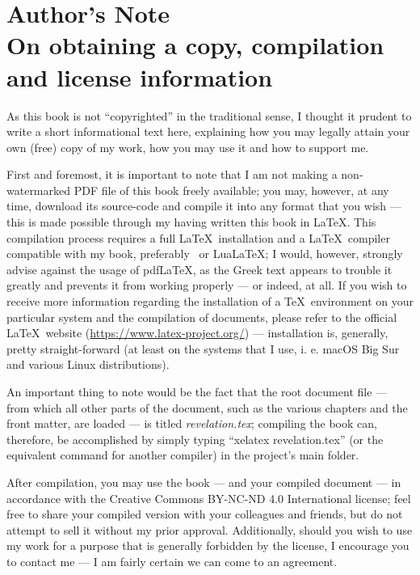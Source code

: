 \chapter*{Author's Note  \\ \large On obtaining a copy, compilation and license information}

As this book is not “copyrighted” in the traditional sense, I thought it prudent to write a short informational text here, explaining how you may legally attain your own (free) copy of my work, how you may use it and how to support me. 

First and foremost, it is important to note that I am not making a non-watermarked PDF file of this book freely available; you may, however, at any time, download its source-code and compile it into any format that you wish — this is made possible through my having written this book in \LaTeX. This compilation process requires a full \LaTeX\ installation and a \LaTeX\ compiler compatible with my book, preferably \XeLaTeX\ or Lua\LaTeX; I would, however, strongly advise against the usage of pdf\LaTeX, as the Greek text appears to trouble it greatly and prevents it from working properly — or indeed, at all. If you wish to receive more information regarding the installation of a \TeX\ environment on your particular system and the compilation of documents, please refer to the official \LaTeX\ website (\url{https://www.latex-project.org/}) — installation is, generally, pretty straight-forward (at least on the systems that I use, i. e. macOS Big Sur and various Linux distributions). 

An important thing to note would be the fact that the root document file — from which all other parts of the document, such as the various chapters and the front matter, are loaded — is titled \textit{revelation.tex}; compiling the book can, therefore, be accomplished by simply typing “xelatex revelation.tex” (or the equivalent command for another compiler) in the project's main folder. 

After compilation, you may use the book — and your compiled document — in accordance with the Creative Commons BY-NC-ND 4.0 International license; feel free to share your compiled version with your colleagues and friends, but do not attempt to sell it without my prior approval. Additionally, should you wish to use my work for a purpose that is generally forbidden by the license, I encourage you to contact me — I am fairly certain we can come to an agreement.

